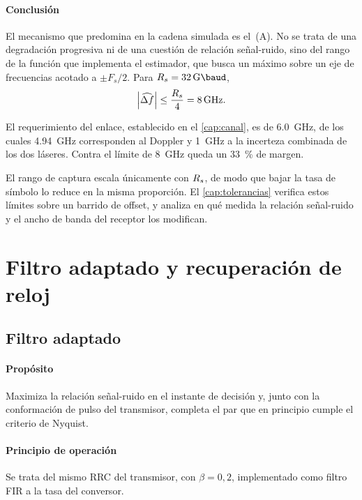 \paragraph{Conclusi\'on}
El mecanismo que predomina en la cadena simulada es el~(A). No se trata de una
degradaci\'on progresiva ni de una cuesti\'on de relaci\'on se\~nal-ruido,
sino del rango de la funci\'on que implementa el estimador, que busca un
m\'aximo sobre un eje de frecuencias acotado a $\pm F_s/2$. Para $\Rs = \SI{32}{\giga\baud}$,
\begin{equation}
  \left\lvert \widehat{\Delta f} \right\rvert \leq \frac{R_{s}}{4} = \SI{8}{\giga\hertz}.
  \label{eq:techo-duro}
\end{equation}

El requerimiento del enlace, establecido en el \cref{cap:canal}, es de
\SI{6.0}{\giga\hertz}, de los cuales \SI{4.94}{\giga\hertz} corresponden al
Doppler y \SI{1}{\giga\hertz} a la incerteza combinada de los dos l\'aseres.
Contra el l\'imite de \SI{8}{\giga\hertz} queda un \SI{33}{\percent} de margen.

El rango de captura escala \'unicamente con $R_{s}$, de modo que bajar la tasa
de s\'imbolo lo reduce en la misma proporci\'on. El \cref{cap:tolerancias}
verifica estos l\'imites sobre un barrido de offset, y analiza en qu\'e medida
la relaci\'on se\~nal-ruido y el ancho de banda del receptor los modifican.

\section{Filtro adaptado y recuperaci\'on de reloj}
\label{sec:dsp-mf-clock}

\subsection{Filtro adaptado}
\label{sec:dsp-mf}

\paragraph{Prop\'osito}
Maximiza la relaci\'on se\~nal-ruido en el instante de decisi\'on y, junto con
la conformaci\'on de pulso del transmisor, completa el par que en principio
cumple el criterio de Nyquist.

\paragraph{Principio de operaci\'on}
Se trata del mismo RRC del transmisor, con $\beta = 0{,}2$, implementado como filtro
FIR a la tasa del conversor.

